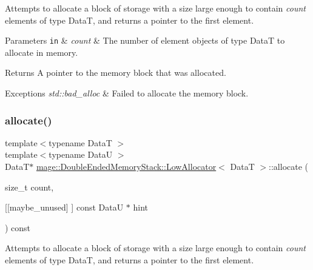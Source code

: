 Attempts to allocate a block of storage with a size large enough to contain {\itshape count} elements of type {\ttfamily DataT}, and returns a pointer to the first element.


\begin{DoxyParams}[1]{Parameters}
\mbox{\tt in}  & {\em count} & The number of element objects of type {\ttfamily DataT} to allocate in memory. \\
\hline
\end{DoxyParams}
\begin{DoxyReturn}{Returns}
A pointer to the memory block that was allocated. 
\end{DoxyReturn}

\begin{DoxyExceptions}{Exceptions}
{\em std\+::bad\+\_\+alloc} & Failed to allocate the memory block. \\
\hline
\end{DoxyExceptions}
\hypertarget{structmage_1_1_double_ended_memory_stack_1_1_low_allocator_a583da1f43e228462faca5876581474c8}{}\label{structmage_1_1_double_ended_memory_stack_1_1_low_allocator_a583da1f43e228462faca5876581474c8} 
\subsubsection{\texorpdfstring{allocate()}{allocate()}\hspace{0.1cm}{\footnotesize\ttfamily [2/2]}}
{\footnotesize\ttfamily template$<$typename DataT $>$ \\
template$<$typename DataU $>$ \\
DataT$\ast$ \hyperlink{structmage_1_1_double_ended_memory_stack_1_1_low_allocator}{mage\+::\+Double\+Ended\+Memory\+Stack\+::\+Low\+Allocator}$<$ DataT $>$\+::allocate (\begin{DoxyParamCaption}\item[{size\+\_\+t}]{count,  }\item[{\mbox{[}\mbox{[}maybe\+\_\+unused\mbox{]} \mbox{]} const DataU $\ast$}]{hint }\end{DoxyParamCaption}) const}

Attempts to allocate a block of storage with a size large enough to contain {\itshape count} elements of type {\ttfamily DataT}, and returns a pointer to the first element.


